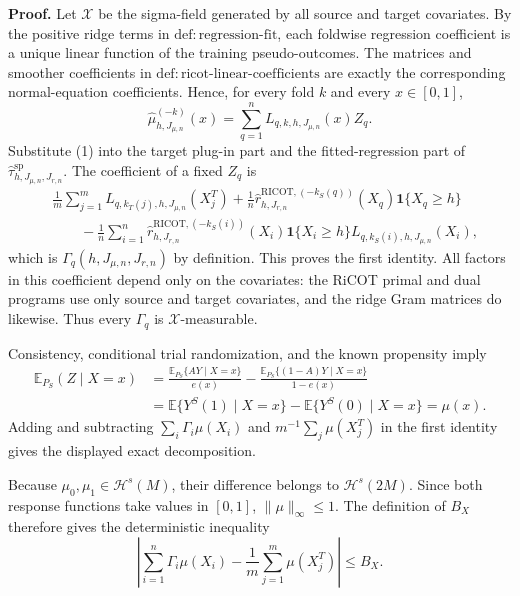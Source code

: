 \textbf{Proof.}
Let \(\mathscr X\) be the sigma-field generated by all source and target covariates. By the positive ridge terms in \(\mathrm{def:regression\text{-}fit}\), each foldwise regression coefficient is a unique linear function of the training pseudo-outcomes. The matrices and smoother coefficients in \(\mathrm{def:ricot\text{-}linear\text{-}coefficients}\) are exactly the corresponding normal-equation coefficients. Hence, for every fold \(k\) and every \(x\in[0,1]\),
\[
\widehat\mu^{(-k)}_{h,J_{\mu,n}}(x)
=\sum_{q=1}^n L_{q,k,h,J_{\mu,n}}(x)Z_q.
\tag{1}
\]
Substitute (1) into the target plug-in part and the fitted-regression part of \(\widehat\tau^{\mathrm{sp}}_{h,J_{\mu,n},J_{r,n}}\). The coefficient of a fixed \(Z_q\) is
\[
\begin{aligned}
&\frac1m\sum_{j=1}^mL_{q,k_T(j),h,J_{\mu,n}}(X_j^T)
+\frac1n\widehat r^{\mathrm{RICOT},(-k_S(q))}_{h,J_{r,n}}(X_q)\mathbf 1\{X_q\ge h\}\\
&\qquad-\frac1n\sum_{i=1}^n
\widehat r^{\mathrm{RICOT},(-k_S(i))}_{h,J_{r,n}}(X_i)\mathbf 1\{X_i\ge h\}
L_{q,k_S(i),h,J_{\mu,n}}(X_i),
\end{aligned}
\]
which is \(\Gamma_q(h,J_{\mu,n},J_{r,n})\) by definition. This proves the first identity. All factors in this coefficient depend only on the covariates: the RiCOT primal and dual programs use only source and target covariates, and the ridge Gram matrices do likewise. Thus every \(\Gamma_q\) is \(\mathscr X\)-measurable.

Consistency, conditional trial randomization, and the known propensity imply
\[
\begin{aligned}
\mathbb E_{P_S}(Z\mid X=x)
&=\frac{\mathbb E_{P_S}\{AY\mid X=x\}}{e(x)}
-\frac{\mathbb E_{P_S}\{(1-A)Y\mid X=x\}}{1-e(x)}\\
&=\mathbb E\{Y^S(1)\mid X=x\}-\mathbb E\{Y^S(0)\mid X=x\}
=\mu(x).
\end{aligned}
\tag{2}
\]
Adding and subtracting \(\sum_i\Gamma_i\mu(X_i)\) and \(m^{-1}\sum_j\mu(X_j^T)\) in the first identity gives the displayed exact decomposition.

Because \(\mu_0,\mu_1\in\mathcal H^s(M)\), their difference belongs to \(\mathcal H^s(2M)\). Since both response functions take values in \([0,1]\), \(\|\mu\|_\infty\le1\). The definition of \(B_X\) therefore gives the deterministic inequality
\[
\left|\sum_{i=1}^n\Gamma_i\mu(X_i)-\frac1m\sum_{j=1}^m\mu(X_j^T)\right|\le B_X.
\tag{3}
\]

